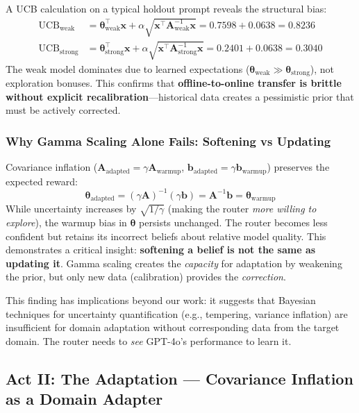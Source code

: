A UCB calculation on a typical holdout prompt reveals the structural bias:
\begin{align}
\text{UCB}_{\text{weak}} &= \boldsymbol{\theta}_{\text{weak}}^\top \mathbf{x} + \alpha \sqrt{\mathbf{x}^\top \mathbf{A}_{\text{weak}}^{-1} \mathbf{x}} = 0.7598 + 0.0638 = 0.8236 \\
\text{UCB}_{\text{strong}} &= \boldsymbol{\theta}_{\text{strong}}^\top \mathbf{x} + \alpha \sqrt{\mathbf{x}^\top \mathbf{A}_{\text{strong}}^{-1} \mathbf{x}} = 0.2401 + 0.0638 = 0.3040
\end{align}
The weak model dominates due to learned expectations ($\boldsymbol{\theta}_{\text{weak}} \gg \boldsymbol{\theta}_{\text{strong}}$), not exploration bonuses. This confirms that \textbf{offline-to-online transfer is brittle without explicit recalibration}—historical data creates a pessimistic prior that must be actively corrected.

\subsubsection{Why Gamma Scaling Alone Fails: Softening vs Updating}

Covariance inflation ($\mathbf{A}_{\text{adapted}} = \gamma \mathbf{A}_{\text{warmup}}$, $\mathbf{b}_{\text{adapted}} = \gamma \mathbf{b}_{\text{warmup}}$) preserves the expected reward:
\begin{equation}
\boldsymbol{\theta}_{\text{adapted}} = (\gamma \mathbf{A})^{-1} (\gamma \mathbf{b}) = \mathbf{A}^{-1} \mathbf{b} = \boldsymbol{\theta}_{\text{warmup}}
\end{equation}
While uncertainty increases by $\sqrt{1/\gamma}$ (making the router \emph{more willing to explore}), the warmup bias in $\boldsymbol{\theta}$ persists unchanged. The router becomes less confident but retains its incorrect beliefs about relative model quality. This demonstrates a critical insight: \textbf{softening a belief is not the same as updating it}. Gamma scaling creates the \emph{capacity} for adaptation by weakening the prior, but only new data (calibration) provides the \emph{correction}.

This finding has implications beyond our work: it suggests that Bayesian techniques for uncertainty quantification (e.g., tempering, variance inflation) are insufficient for domain adaptation without corresponding data from the target domain. The router needs to \emph{see} GPT-4o's performance to learn it.

\subsection{Act II: The Adaptation — Covariance Inflation as a Domain Adapter}
\label{sec:adaptation}

